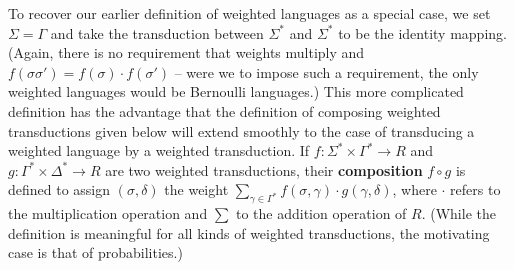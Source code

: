 To recover our earlier definition of weighted languages as a special case, we
set $\Sigma=\Gamma$ and take the transduction between $\Sigma^*$ and
$\Sigma^*$ to be the identity mapping. (Again, there is no requirement that
weights multiply and $f(\sigma\sigma')= f(\sigma) \cdot f(\sigma')$ -- were
we to impose such a requirement, the only weighted languages would be Bernoulli
languages.) This more complicated definition has the advantage that the
definition of composing weighted transductions given below will extend
smoothly to the case of transducing a weighted language by a weighted
transduction. If $f: \Sigma^* \times \Gamma^* \rightarrow R$ and $g: \Gamma^*
\times \Delta^* \rightarrow R$ are two weighted transductions, their {\bf
  composition} $f \circ g$ is defined to assign $(\sigma,\delta)$ the weight
$\sum_{\gamma \in \Gamma^*} f(\sigma,\gamma) \cdot g(\gamma,\delta)$, where
$\cdot$ refers to the multiplication operation and $\sum$ to the addition
operation of $R$. 
(While the definition is meaningful for all kinds of weighted transductions,
the motivating case is that of probabilities.)

